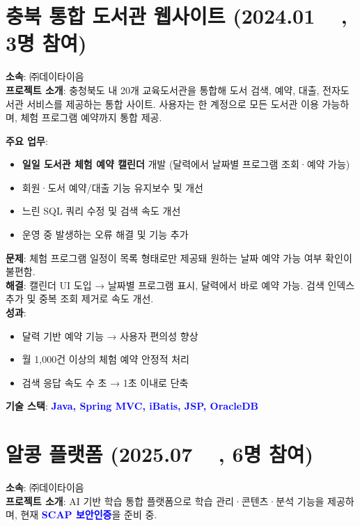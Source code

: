 \documentclass[a4paper,11pt]{article}
\newcommand{\tech}[1]{\textbf{\textcolor{blue}{#1}}}
\begin{document}
\section{충북 통합 도서관 웹사이트 (2024.01 ~ , 3명 참여)}

\textbf{소속}: ㈜데이타이음 \\
\textbf{프로젝트 소개}:  
충청북도 내 20개 교육도서관을 통합해  
도서 검색, 예약, 대출, 전자도서관 서비스를 제공하는 통합 사이트.  
사용자는 한 계정으로 모든 도서관 이용 가능하며, 체험 프로그램 예약까지 통합 제공.

\textbf{주요 업무}:
\begin{itemize}[leftmargin=*]
  \item \textbf{일일 도서관 체험 예약 캘린더} 개발 (달력에서 날짜별 프로그램 조회·예약 가능)
  \item 회원·도서 예약/대출 기능 유지보수 및 개선
  \item 느린 SQL 쿼리 수정 및 검색 속도 개선
  \item 운영 중 발생하는 오류 해결 및 기능 추가
\end{itemize}

\textbf{문제}: 체험 프로그램 일정이 목록 형태로만 제공돼 원하는 날짜 예약 가능 여부 확인이 불편함. \\
\textbf{해결}: 캘린더 UI 도입 → 날짜별 프로그램 표시, 달력에서 바로 예약 가능. 검색 인덱스 추가 및 중복 조회 제거로 속도 개선. \\
\textbf{성과}:
\begin{itemize}[leftmargin=*]
  \item 달력 기반 예약 기능 → 사용자 편의성 향상
  \item 월 1,000건 이상의 체험 예약 안정적 처리
  \item 검색 응답 속도 수 초 → 1초 이내로 단축
\end{itemize}

\textbf{기술 스택}: \tech{Java, Spring MVC, iBatis, JSP, OracleDB}

\section{알콩 플랫폼 (2025.07 ~ , 6명 참여)}

\textbf{소속}: ㈜데이타이음 \\
\textbf{프로젝트 소개}:  
AI 기반 학습 통합 플랫폼으로 학습 관리·콘텐츠·분석 기능을 제공하며,  
현재 \tech{SCAP 보안인증}을 준비 중.
\end{document}
